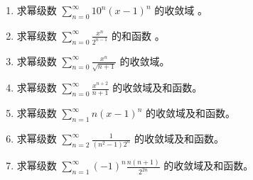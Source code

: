 \documentclass[12pt, a4paper]{article}
\newcommand{\blank}[1]{\underline{\hspace{#1}}}
\begin{document}
\begin{enumerate}
    \item 求幂级数 $ \sum_{n=0}^{\infty} 10^{n}(x-1)^{n} $ 的收敛域 \blank{2cm}。

    \item 求幂级数 $ \sum_{n=0}^{\infty} \frac{x^{n}}{2^{n-1}} $ 的和函数 \blank{2cm}。

    \item 求幂级数 $ \sum_{n=0}^{\infty}\frac{x^{n}}{\sqrt{n+1}} $ 的收敛域。

    \item 求幂级数 $ \sum_{n=0}^{\infty} \frac{x^{n+2}}{n+1} $ 的收敛域及和函数。

    \item 求幂级数 $ \sum_{n=1}^{\infty} n(x-1)^{n} $ 的收敛域及和函数。

    \item 求幂级数 $ \sum_{n=2}^{\infty}\frac{1}{(n^{2}-1)2^{n}} $ 的收敛域及和函数。

    \item 求幂级数 $ \sum_{n=1}^{\infty} (-1)^{n} \frac{n(n+1)}{2^{2n}} $ 的收敛域及和函数。
\end{enumerate}
\end{document}
